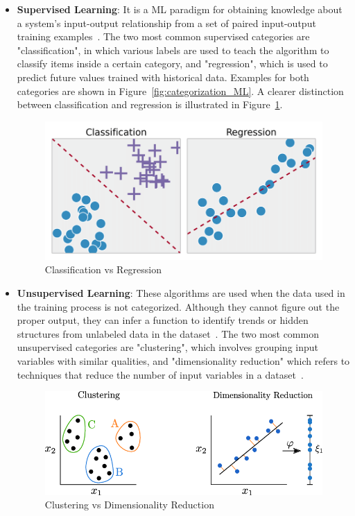 \begin{itemize}
    \item \textbf{Supervised Learning}: It is a \gls{ML} paradigm for obtaining knowledge about a system's input-output relationship from a set of paired input-output training examples~\cite{Liu2012SupervisedLearning}. The two most common supervised categories are "classification", in which various labels are used to teach the algorithm to classify items inside a certain category, and "regression", which is used to predict future values trained with historical data. Examples for both categories are shown in Figure~\ref{fig:categorization_ML}. A clearer distinction between classification and regression is illustrated in Figure~\ref{fig:regression_vs_classification}.
    
    \begin{figure}[htbp]
        \centering
        \includegraphics[width=0.7\linewidth]{Chapters/Figures/regression-vs-classification.png}
        \caption{Classification vs Regression~\cite{Matanga2017AnalysisInterfaces}}
        \label{fig:regression_vs_classification}
    \end{figure}
    
    \item \textbf{Unsupervised Learning}: These algorithms are used when the data used in the training process is not categorized. Although they cannot figure out the proper output, they can infer a function to identify trends or hidden structures from unlabeled data in the dataset~\cite{2020WhatExpert.ai}. The two most common unsupervised categories are "clustering", which involves grouping input variables with similar qualities, and "dimensionality reduction" which refers to techniques that reduce the number of input variables in a dataset~\cite{Advani2021WhatUses,Brownlee2020IntroductionLearning}. 
    
    \begin{figure}[htbp]
        \centering
        \includegraphics[width=0.7\linewidth]{Chapters/Figures/clustering_vs_DR.png}
        \caption{Clustering vs Dimensionality Reduction~\cite{Beck2020AModelling}}
        \label{fig:clustering_vs_DR}
    \end{figure}
    

\end{itemize}
